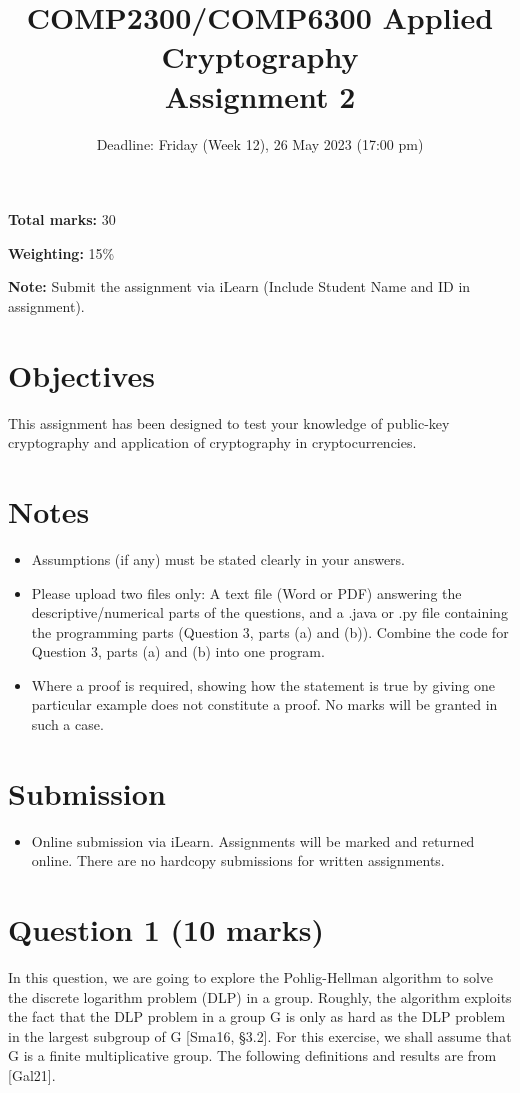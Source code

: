 \documentclass{article}
\begin{document}
\title{COMP2300/COMP6300 Applied Cryptography \\ Assignment 2}
\date{Deadline: Friday (Week 12), 26 May 2023 (17:00 pm)}
\maketitle

\textbf{Total marks:} 30

\textbf{Weighting:} 15\%

\textbf{Note:} Submit the assignment via iLearn (Include Student Name and ID in assignment).

\section*{Objectives}
This assignment has been designed to test your knowledge of public-key cryptography and application of cryptography in cryptocurrencies.

\section*{Notes}
\begin{itemize}
\item Assumptions (if any) must be stated clearly in your answers.
\item Please upload two files only: A text file (Word or PDF) answering the descriptive/numerical parts of the questions, and a .java or .py file containing the programming parts (Question 3, parts (a) and (b)). Combine the code for Question 3, parts (a) and (b) into one program.
\item Where a proof is required, showing how the statement is true by giving one particular example does not constitute a proof. No marks will be granted in such a case.
\end{itemize}

\section*{Submission}
\begin{itemize}
\item Online submission via iLearn. Assignments will be marked and returned online. There are no hardcopy submissions for written assignments.
\end{itemize}


\section{Question 1 (10 marks)}
In this question, we are going to explore the Pohlig-Hellman algorithm to solve the discrete logarithm problem (DLP) in a group. Roughly, the algorithm exploits the fact that the DLP problem in a group G is only as hard as the DLP problem in the largest subgroup of G [Sma16, §3.2]. For this exercise, we shall assume that G is a finite multiplicative group. The following definitions and results are from [Gal21].
\end{document}
